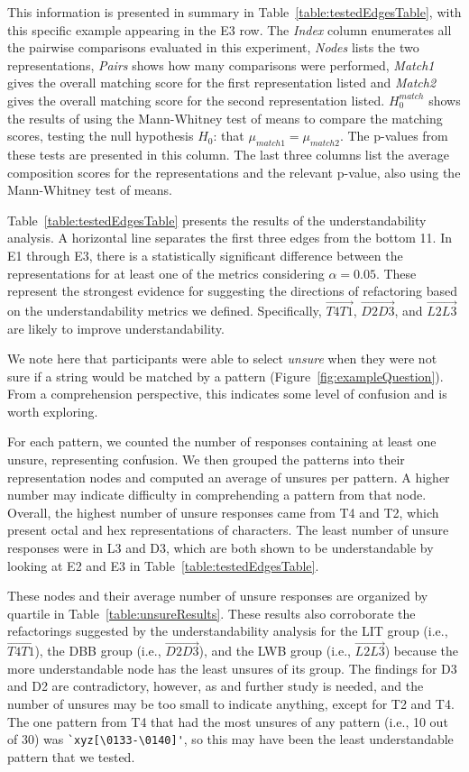 This information is presented in summary in Table~\ref{table:testedEdgesTable}, with this specific example appearing in the E3 row. The \emph{Index} column enumerates all the pairwise comparisons evaluated in this experiment, \emph{Nodes} lists the two representations, \emph{Pairs} shows how many comparisons were performed, \emph{Match1} gives the overall matching score for the first representation listed and \emph{Match2} gives the overall matching score for the second representation listed. $H_0^{match}$ shows the results of using the Mann-Whitney test of means to compare the matching scores, testing the null hypothesis $H_0$: that $\mu_{match1} = \mu_{match2}$.  The p-values from these tests are presented in this column. The last three columns list the average composition scores for the representations and the relevant p-value, also using the Mann-Whitney test of means.

Table~\ref{table:testedEdgesTable} presents the results of the understandability analysis. A horizontal line separates the first three edges from the bottom 11. In E1 through E3, there is a statistically significant difference between the representations for at least one of the metrics considering $\alpha = 0.05$.  These represent the strongest evidence for suggesting the directions of refactoring based on the understandability metrics we defined. Specifically, $\overrightarrow{T4 T1}$, $\overrightarrow{D2 D3}$, and $\overrightarrow{L2 L3}$
are likely to improve understandability.

We note here that participants were able to select \emph{unsure} when they were not sure if a string would be matched by a pattern (Figure~\ref{fig:exampleQuestion}). From a comprehension perspective, this indicates some level of confusion and is worth exploring.



For each pattern, we counted the number of responses containing at least one unsure, representing confusion.
We then grouped the patterns into their representation nodes and computed an average of unsures per pattern.
A higher number may indicate difficulty in comprehending a pattern from that node.
Overall, the highest number of unsure responses came from T4 and T2, which present octal and hex representations of characters. The least number of unsure responses were in L3 and D3, which are both shown to be understandable by looking at E2 and E3 in Table~\ref{table:testedEdgesTable}.

These nodes and their average number of unsure responses are organized by quartile in Table~\ref{table:unsureResults}.
These results also corroborate the refactorings suggested by the understandability analysis for the LIT group (i.e., $\overrightarrow{T4 T1}$), the DBB group (i.e.,  $\overrightarrow{D2 D3}$), and the LWB group (i.e., $\overrightarrow{L2 L3}$) because the more understandable node has the least unsures of its group.
The findings for D3 and D2 are contradictory, however, as  and further study is needed, and the number of unsures may be too small to indicate anything, except for T2 and T4.  The one pattern from T4 that had the most unsures of any pattern (i.e., 10 out of 30) was \verb!`xyz[\0133-\0140]'!, so this may have been the least understandable pattern that we tested.
